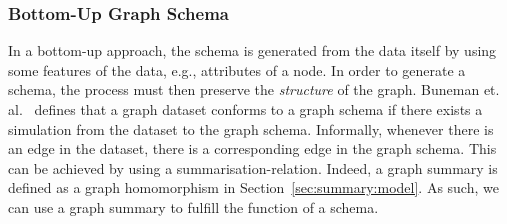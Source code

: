 \subsubsection{Bottom-Up Graph Schema}

In a bottom-up approach, the schema is generated from the data itself by using some features of the data, e.g., \gls{attributes} of a node. In order to generate a schema, the process must then preserve the \emph{structure} of the graph. %
Buneman et. al.~\cite{buneman:1997:asu} defines that a graph dataset conforms to a graph schema if there exists a simulation from the dataset to the graph schema. Informally, whenever there is an edge in the dataset, there is a corresponding edge in the graph schema. 
This can be achieved by using a \gls{summarisation-relation}. Indeed, a graph summary is defined as a graph homomorphism in Section~\ref{sec:summary:model}. As such, we can use a graph summary to fulfill the function of a schema.



